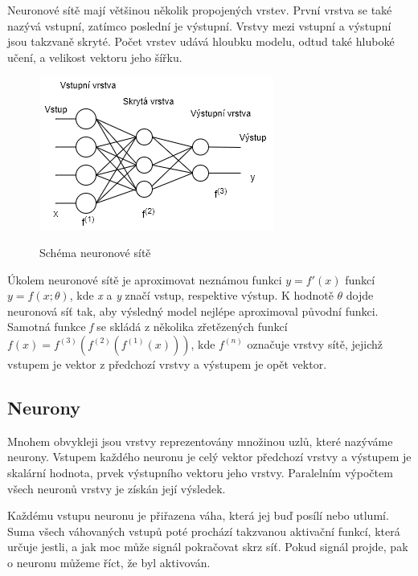 Neuronové sítě mají většinou několik propojených vrstev.
První vrstva se také nazývá vstupní, 
zatímco poslední je výstupní.
Vrstvy mezi vstupní a výstupní jsou takzvaně skryté.
Počet vrstev udává hloubku modelu, odtud také hluboké učení, 
a velikost vektoru jeho šířku.

\begin{figure}[h]\centering
    \centering
    \includegraphics[width=0.6\linewidth]{obrazky/NNSchema.png}\\[1pt]  
    \caption{Schéma neuronové sítě}    
    \label{obrazekSchemaNeuronoveSite}
\end{figure}

Úkolem neuronové sítě je aproximovat neznámou funkci $ y=f'(x)$
funkcí $ y=f(x;\theta )$, kde \emph{x} a \emph{y} značí vstup, 
respektive výstup.
K hodnotě $\theta$ dojde neuronová síť tak,
aby výsledný model nejlépe aproximoval původní funkci.
Samotná funkce \emph{f} se skládá z několika zřetězených funkcí 
$f(x)=f^{(3)}(f^{(2)}(f^{(1)}(x)))$,
kde $f^{(n)}$ označuje vrstvy sítě, 
jejichž vstupem je vektor z předchozí vrstvy 
a výstupem je opět vektor.
\cite{Goodfellow-et-al-2016}

\subsection*{Neurony}
Mnohem obvykleji jsou vrstvy reprezentovány množinou uzlů, 
které nazýváme neurony.
Vstupem každého neuronu je celý vektor předchozí vrstvy 
a výstupem je skalární hodnota, prvek výstupního vektoru jeho vrstvy.
Paralelním výpočtem všech neuronů vrstvy je získán její výsledek.
\cite{Goodfellow-et-al-2016}
\par

Každému vstupu neuronu je přiřazena váha, která jej buď posílí nebo utlumí.
Suma všech váhovaných vstupů poté prochází takzvanou aktivační funkcí,
která určuje jestli, a jak moc může signál pokračovat skrz síť.
Pokud signál projde, pak o neuronu můžeme říct, že byl aktivován.
\cite{Nicholson_NeuralNets}

